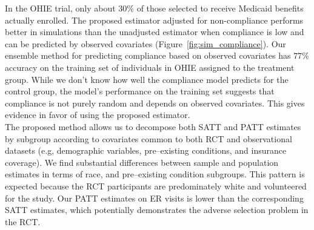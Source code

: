 \documentclass[12pt]{article}
\begin{document}
In the OHIE trial, only about $30\%$ of those selected to receive Medicaid benefits actually enrolled. The proposed estimator adjusted for non-compliance performs better in simulations than the unadjusted estimator when compliance is low and can be predicted by observed covariates (Figure~\ref{fig:sim_compliance}).  Our ensemble method for predicting compliance based on observed covariates has $77\%$ accuracy on the training set of individuals in OHIE assigned to the treatment group.  While we don't know how well the compliance model predicts for the control group, the model's performance on the training set suggests that compliance is not purely random and depends on observed covariates.  This gives evidence in favor of using the proposed estimator.  \\

The proposed method allows us to decompose both SATT and PATT estimates by subgroup according to covariates common to both RCT and observational datasets (e.g, demographic variables, pre--existing conditions, and insurance coverage). We find substantial differences between sample and population estimates in terms of race, and pre--existing condition subgroups. This pattern is expected because the RCT participants are predominately white and volunteered for the study.  Our PATT estimates on ER visits is lower than the corresponding SATT estimates, which potentially demonstrates the adverse selection problem in the RCT.

\end{document}
